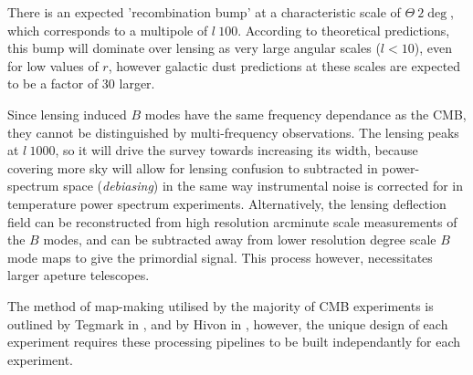\par There is an expected 'recombination bump' at a characteristic scale of $\Theta ~ 2\deg$, which corresponds to a multipole of $l ~ 100$. According to theoretical predictions, this bump will dominate over lensing as very large angular scales ($l<10$), even for low values of $r$, however galactic dust predictions at these scales are expected to be a factor of 30 larger.

\par Since lensing induced $B$ modes have the same frequency dependance as the CMB, they cannot be distinguished by multi-frequency observations. The lensing peaks at $l ~1000$, so it will drive the survey towards increasing its width, because covering more sky will allow for lensing confusion to subtracted in power-spectrum space (\textit{debiasing}) in the same way instrumental noise is corrected for in temperature power spectrum experiments. Alternatively, the lensing deflection field can be reconstructed from high resolution arcminute scale measurements of the $B$ modes, and can be subtracted away from lower resolution degree scale $B$ mode maps to give the primordial signal. This process however, necessitates larger apeture telescopes.

\par The method of map-making utilised by the majority of CMB experiments is outlined by Tegmark in \cite{astro-ph/9705188}, and by Hivon in \cite{astro-ph/0105302}, however, the unique design of each experiment requires these processing pipelines to be built independantly for each experiment. 

